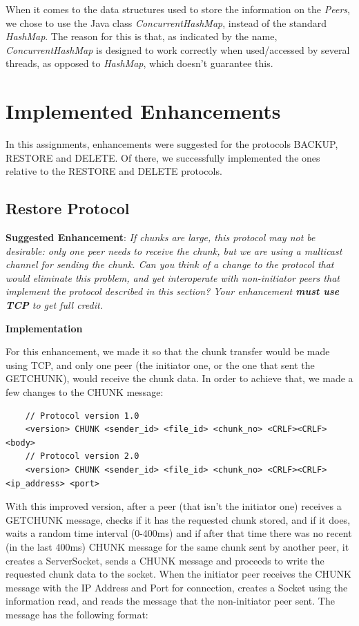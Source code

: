 \documentclass[a4paper]{article}
\begin{document}
When it comes to the data structures used to store the information on the \textit{Peers}, we
chose to use the Java class \textit{ConcurrentHashMap}, instead of the standard \textit{HashMap}.
The reason for this is that, as indicated by the name, \textit{ConcurrentHashMap} is designed to
work correctly when used/accessed by several threads, as opposed to \textit{HashMap}, which
doesn't guarantee this.

\newpage
\section{Implemented Enhancements}
In this assignments, enhancements were suggested for the protocols BACKUP, RESTORE and DELETE. Of
there, we successfully implemented the ones relative to the RESTORE and DELETE protocols.

\subsection{Restore Protocol}

\textbf{Suggested Enhancement}:
\textit{If chunks are large, this protocol may not be desirable: only one peer needs to receive 
the chunk, but we are using a multicast channel for sending the chunk. Can you think of a change
to the protocol that would eliminate this problem, and yet interoperate with non-initiator peers
that implement the protocol described in this section? Your enhancement \textbf{must use TCP} to
get full credit.}

\bigskip\textbf{Implementation}

For this enhancement, we made it so that the chunk transfer would be made using TCP, and only one peer (the initiator one, or the one that sent the GETCHUNK), would receive the chunk data. In order to achieve that, we made a few changes to the CHUNK message:

\begin{lstlisting}
    // Protocol version 1.0
    <version> CHUNK <sender_id> <file_id> <chunk_no> <CRLF><CRLF><body>
    // Protocol version 2.0
    <version> CHUNK <sender_id> <file_id> <chunk_no> <CRLF><CRLF><ip_address> <port> 
\end{lstlisting}

With this improved version, after a peer (that isn't the initiator one) receives a GETCHUNK 
message, checks if it has the requested chunk stored, and if it does, waits a random time 
interval (0-400ms) and if after that time there was no recent (in the last 400ms) CHUNK message 
for the same chunk sent by another peer, it creates a ServerSocket, sends a CHUNK message and 
proceeds to write the requested chunk data to the socket. When the initiator peer receives the 
CHUNK message with the IP Address and Port for connection, creates a Socket using the information
read, and reads the message that the non-initiator peer sent. The message has the following
format: 
\end{document}
